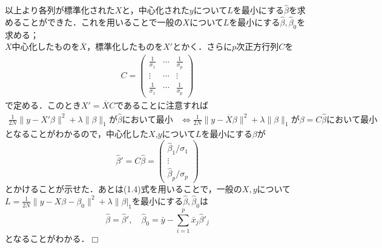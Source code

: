 \documentclass{jsarticle}
\theoremstyle{definition}
\theoremstyle{mystyle} %
\def\qed{\hfill$\Box$}
\begin{document}
以上より各列が標準化された$X$と，中心化された$y$について$L$を最小にする$\hat{\beta}$を求めることができた．これを用いることで一般の$X$について$L$を最小にする$\hat{\beta},\hat{\beta}_0$を求める；\\

$X$中心化したものを$\overline{X}$，標準化したものを$X'$とかく．さらに$p$次正方行列$C$を
\begin{align*}
C=\displaystyle\begin{pmatrix}
\frac{1}{\sigma_1} & \cdots & \frac{1}{\sigma_p}\\
\vdots & \cdots & \vdots\\
\frac{1}{\sigma_1}& \cdots & \frac{1}{\sigma_p}
\end{pmatrix}
\end{align*}
で定める．このとき$X'=\overline{X}C$であることに注意すれば
\begin{align*}
\frac{1}{2N}\|y-X'\beta\|^2 +\lambda\|\beta\|_1が\hat{\beta}において最小
&\Leftrightarrow  \frac{1}{2N}\|y-\overline{X}\beta\|^2 +\lambda\|\beta\|_1が \beta = C\hat{\beta}において最小
\end{align*}
となることがわかるので，中心化した$X$,$y$について$L$を最小にする$\beta$が
$$\hat{\beta}'=C\hat{\beta} = \begin{pmatrix}
\hat{\beta}_1/\sigma_1\\
\displaystyle\vdots\\
\hat{\beta}_p/\sigma_p
\end{pmatrix}$$
とかけることが示せた．あとは(1.4)式を用いることで，一般の$X,y$について
$L=\frac{1}{2N}\|y-X\beta-\beta_0\|^2+ \lambda\|\beta|_1$を最小にする$\hat{\beta},\hat{\beta}_0$は
$$\hat{\beta} =\hat{\beta}',\quad \hat{\beta}_0= \bar{y}-\sum_{i=1}^p\bar{x}_j\hat{\beta}'_j$$
となることがわかる．\qed\\
\end{document}
